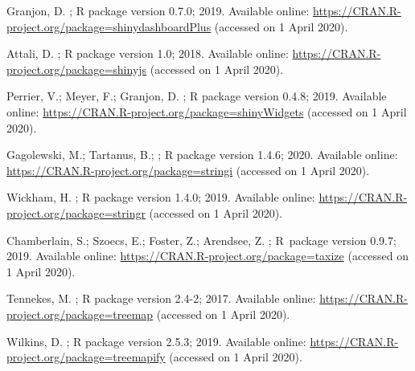 \documentclass[data,datadescriptor,accept,moreauthors,pdftex]{Definitions/mdpi}
\begin{document}
\begin{thebibliography}{999}
Granjon, D.
;
\newblock R package version 0.7.0;  2019.
\newblock Available online: \url{https://CRAN.R-project.org/package=shinydashboardPlus}
\newblock (accessed on 1 April 2020).

Attali, D.
;
\newblock R package version 1.0;  2018.
\newblock Available online: \url{https://CRAN.R-project.org/package=shinyjs}
\newblock (accessed on 1 April 2020).

Perrier, V.; Meyer, F.; Granjon, D.
;
\newblock R package version 0.4.8;  2019.
\newblock Available online: \url{https://CRAN.R-project.org/package=shinyWidgets}
\newblock (accessed on 1 April 2020).

Gagolewski, M.; Tartanus, B.;
;
\newblock R package version 1.4.6;  2020.
\newblock Available online: \url{https://CRAN.R-project.org/package=stringi}
\newblock (accessed on 1 April 2020).

Wickham, H.
;
\newblock R package version 1.4.0;  2019.
\newblock Available online: \url{https://CRAN.R-project.org/package=stringr}
\newblock (accessed on 1 April 2020).

Chamberlain, S.; Szoecs, E.; Foster, Z.; Arendsee, Z.
;
\newblock R~package version 0.9.7;  2019.
\newblock Available online: \url{https://CRAN.R-project.org/package=taxize}
\newblock (accessed on 1 April 2020).

Tennekes, M.
;
\newblock R package version 2.4-2;  2017.
\newblock Available online: \url{https://CRAN.R-project.org/package=treemap}
\newblock (accessed on 1 April 2020).

Wilkins, D.
;
\newblock R package version 2.5.3;  2019.
\newblock Available online: \url{https://CRAN.R-project.org/package=treemapify}
\newblock (accessed on 1 April 2020).


\end{thebibliography}
\end{document}
